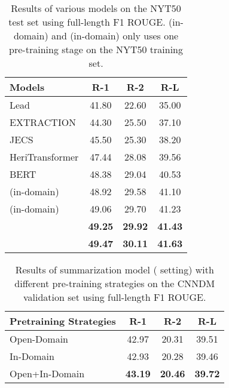 \documentclass[11pt,a4paper]{article}
\begin{document}
\begin{table}[t]
	\centering
\begin{tabular}[t]{|@{~}l @{~}|@{~}c c c@{~}|}
		\hline
		Models & R-1 & R-2 & R-L \\
		\hline
		\hline
		Lead & 41.80 & 22.60 & 35.00 \\
		EXTRACTION & 44.30 & 25.50 & 37.10 \\
		JECS & 45.50 & 25.30 & 38.20 \\
		
		HeriTransformer & 47.44 & 28.08 & 39.56 \\	
		BERT & 48.38 & 29.04 & 40.53 \\ 
		   (in-domain) & 48.92 & 29.58 & 41.10 \\
		  (in-domain)  & 49.06 & 29.70 & 41.23 \\
		  & {\bf 49.25} & {\bf 29.92} & {\bf 41.43} \\
		  & {\bf 49.47} & {\bf 30.11} & {\bf 41.63} \\
		\hline
	\end{tabular}
	\caption{Results of various models on the NYT50 test set
		using full-length F1 ROUGE.    (in-domain) and   (in-domain) only uses one pre-training stage on the NYT50 training set.}
	\label{tbl:nyt50}
\end{table}


\begin{table}[t]
	\centering
\begin{tabular}[t]{|@{~}l @{~}|@{~}c c c@{~}|}
		\hline
		Pretraining Strategies & R-1 & R-2 & R-L \\
		\hline
		\hline
Open-Domain & 42.97 & 20.31 & 39.51 \\ 
		In-Domain & 42.93 & 20.28 & 39.46 \\
		Open+In-Domain & {\bf 43.19} & {\bf 20.46} & {\bf 39.72} \\
		\hline
	\end{tabular}
	\caption{Results of summarization model ( setting) with different pre-training strategies on the CNNDM validation set using full-length F1 ROUGE.}
	\label{tbl:pretrain}
\end{table}
\end{document}
